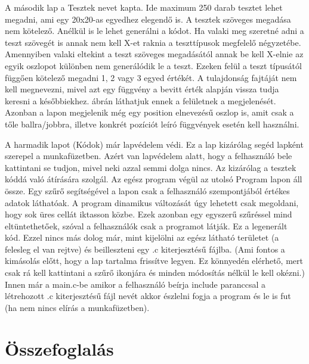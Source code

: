 \documentclass[12pt,a4paper,oneside]{report}
\begin{document}
    
      
    A második lap a Tesztek nevet kapta. Ide maximum 250 darab tesztet lehet megadni, ami egy 20x20-as egyedhez elegendő is.
    A tesztek szöveges megadása nem kötelező.
    Anélkül is le lehet generálni a kódot.
    Ha valaki meg szeretné adni a teszt szövegét is annak nem kell X-et raknia a teszttípusok megfelelő négyzetébe.
    Amennyiben valaki eltekint a teszt szöveges megadásától annak be kell X-elnie az egyik oszlopot különben nem generálódik le a teszt.
    Ezeken felül a teszt típusától függően kötelező megadni 1, 2 vagy 3 egyed értékét.
    A tulajdonság fajtáját nem kell megnevezni, mivel azt egy függvény a bevitt érték alapján vissza tudja keresni a későbbiekhez.
     ábrán láthatjuk ennek a felületnek a megjelenését.
    Azonban a lapon megjelenik még egy position elnevezésű oszlop is, amit csak a tőle ballra/jobbra, illetve konkrét pozíciót leíró függvények esetén kell használni.
    
    A harmadik lapot (Kódok) már lapvédelem védi.
    Ez a lap kizárólag segéd lapként szerepel a munkafüzetben.
    Azért van lapvédelem alatt, hogy a felhasználó bele kattintani se tudjon, mivel neki azzal semmi dolga nincs. Az kizárólag a tesztek kóddá való átírására szolgál.
    Az egész program végül az utolsó Program lapon áll össze.
    Egy szűrő segítségével a lapon csak a felhasználó szempontjából értékes adatok láthatóak.
    A program dinamikus változását úgy lehetett csak megoldani, hogy sok üres cellát iktasson közbe.
    Ezek azonban egy egyszerű szűréssel mind eltüntethetőek, szóval a felhasználók csak a programot látják. Ez a legenerált kód.
    Ezzel nincs más dolog már, mint kijelölni az egész látható területet (a felesleg el van rejtve) és beilleszteni egy .c kiterjesztésű fájlba. (Ami fontos a kimásolás előtt, hogy a lap tartalma frissítve legyen.
    Ez könnyedén elérhető, mert csak rá kell kattintani a szűrő ikonjára és minden módosítás nélkül le kell okézni.)
    Innen már a main.c-be amikor a felhasználó beírja include paranccsal a létrehozott .c kiterjesztésű fájl nevét akkor észlelni fogja a program és le is fut (ha nem nincs elírás a munkafüzetben).

\chapter{Összefoglalás} %

\clearpage
{}


\end{document}
